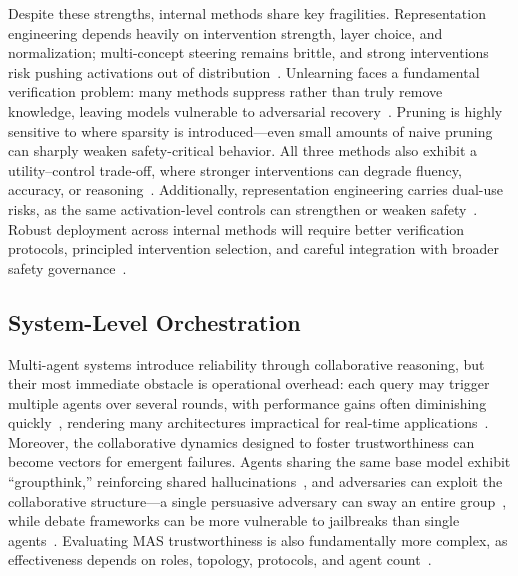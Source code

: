 Despite these strengths, internal methods share key fragilities. Representation engineering depends heavily on intervention strength, layer choice, and normalization; multi-concept steering remains brittle, and strong interventions risk pushing activations out of distribution~\citep{wehner2025taxonomy}. Unlearning faces a fundamental verification problem: many methods suppress rather than truly remove knowledge, leaving models vulnerable to adversarial recovery~\citep{lucki2024adversarial}. Pruning is highly sensitive to where sparsity is introduced---even small amounts of naive pruning can sharply weaken safety-critical behavior. All three methods also exhibit a utility--control trade-off, where stronger interventions can degrade fluency, accuracy, or reasoning~\citep{liu2024breaking}. Additionally, representation engineering carries dual-use risks, as the same activation-level controls can strengthen or weaken safety~\citep{revisiting2025jailbreaking}. Robust deployment across internal methods will require better verification protocols, principled intervention selection, and careful integration with broader safety governance~\citep{nist2025ai8001}.

\subsection{System-Level Orchestration}

Multi-agent systems introduce reliability through collaborative reasoning, but their most immediate obstacle is operational overhead: each query may trigger multiple agents over several rounds, with performance gains often diminishing quickly~\citep{conf/coling/0008L0HF25, 10.5555/3692070.3692537}, rendering many architectures impractical for real-time applications~\citep{song2024auditllmmultiagentcollaborationlogbased}. Moreover, the collaborative dynamics designed to foster trustworthiness can become vectors for emergent failures. Agents sharing the same base model exhibit ``groupthink,'' reinforcing shared hallucinations~\citep{conf/coling/0008L0HF25}, and adversaries can exploit the collaborative structure---a single persuasive adversary can sway an entire group~\citep{amayuelas-etal-2024-multiagent}, while debate frameworks can be more vulnerable to jailbreaks than single agents~\citep{qi2025amplifiedvulnerabilitiesstructuredjailbreak}. Evaluating MAS trustworthiness is also fundamentally more complex, as effectiveness depends on roles, topology, protocols, and agent count~\citep{zhu2025mastermultiagentsecurityexploration}.


